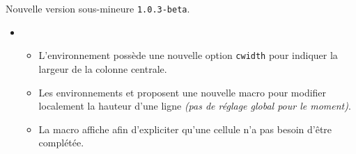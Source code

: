 Nouvelle version sous-mineure \verb+1.0.3-beta+.

\begin{itemize}[itemsep=.5em]
    \item {}
    \begin{itemize}[itemsep=.5em]
        \item L'environnement  possède une nouvelle option \verb#cwidth# pour indiquer la largeur de la colonne centrale.

        \item Les environnements  et  proposent une nouvelle macro  pour modifier localement la hauteur d'une ligne \emph{(pas de réglage global pour le moment)}.
        
        \item La macro  affiche \explnothing{} afin d'expliciter qu'une cellule n'a pas besoin d'être complétée.
    \end{itemize}
\end{itemize}


\separation
